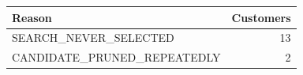 \begin{tabular}{lr}
\toprule
Reason & Customers \\
\midrule
SEARCH\_NEVER\_SELECTED & 13 \\
CANDIDATE\_PRUNED\_REPEATEDLY & 2 \\
\bottomrule
\end{tabular}
